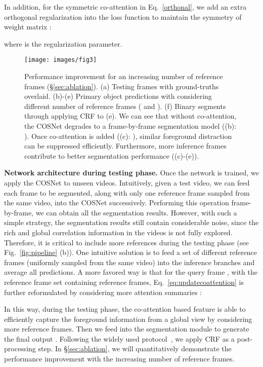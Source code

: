 \documentclass[10pt,twocolumn,letterpaper]{article}
\begin{document}
In addition, for the symmetric co-attention in Eq.~\ref{orthonal}, we add an extra orthogonal regularization into the loss function to maintain the symmetry of weight matrix  :

where  is the regularization parameter.

\begin{figure*}[t]
	\centering
	\texttt{[image: images/fig3]}
	\caption{\small Performance improvement for an increasing number of reference frames (\S\ref{sec:ablation}). (a) Testing frames with ground-truths overlaid. (b)-(e) Primary object predictions with considering different number of reference frames ( and ). (f) Binary segments through applying CRF to (e). We can see that without co-attention, the COSNet degrades to a frame-by-frame segmentation model ((b): ). Once co-attention is added ((c): ), similar foreground distraction can be suppressed efficiently. Furthermore, more inference frames contribute to better segmentation performance ((c)-(e)). }
	\label{fig:fig3}
\vspace*{-8pt}
\end{figure*}










\noindent\textbf{Network architecture during testing phase.} Once the network is trained, we apply the COSNet to unseen videos. Intuitively, given a test video, we can feed each frame to be segmented, along with only one reference frame sampled from the same video, into the COSNet successively. Performing this operation frame-by-frame, we can obtain all the segmentation results. However, with such a simple strategy, the segmentation results still contain considerable noise, since the rich and global correlation information in the videos is not fully explored. Therefore, it is critical to include more references during the testing phase (see Fig.~\ref{fig:pipeline} (b)). One intuitive solution is to feed a set of  different reference frames (uniformly sampled from the same video) into the inference branches and average all predictions. A more favored way is that for the query frame , with the reference frame set  containing  reference frames, Eq.~\ref{eq:updatecoattention} is further reformulated by considering more attention summaries :

In this way, during the testing phase, the co-attention based feature  is able to efficiently capture the foreground information from a global view by considering more reference frames.  Then we feed  into the segmentation module to generate the final output . Following the widely used protocol~\cite{DBLP:conf/iccv/TokmakovAS17,DBLP:conf/cvpr/TokmakovAS17,Song_2018_ECCV}, we apply CRF as a post-processing step. In \S\ref{sec:ablation}, we will quantitatively demonstrate the performance improvement with the increasing number of reference frames.
\end{document}
